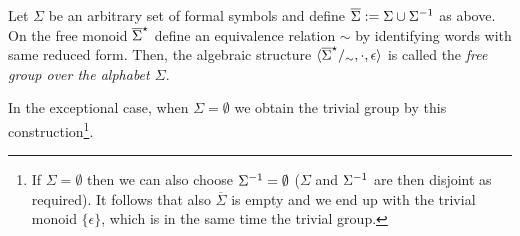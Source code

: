 \begin{definition}
\label{dfn_FreeGroup}
Let $\Sigma$ be an arbitrary set of formal symbols and define $\overline{\Sigma} := \Sigma \cup {\Sigma}^{-1}$ as above. On the free monoid ${\overline{\Sigma}}^{\star}$ define an equivalence relation $\sim$ by identifying words with same reduced form. Then, the algebraic structure $\langle {\overline{\Sigma}}^{\star}/_{\sim}, \cdot, \epsilon \rangle$ is called the \emph{free group over the alphabet $\Sigma$}.
\end{definition}
\begin{remark}
In the exceptional case, when $\Sigma = \emptyset$  we obtain the trivial group by this construction\footnote{If $\Sigma = \emptyset$ then we can also choose ${\Sigma}^{-1} = \emptyset$ ($\Sigma$ and ${\Sigma}^{-1}$ are then disjoint as required). It follows that also $\overline{\Sigma}$ is empty and we end up with the trivial monoid $\{\epsilon\}$, which is in the same time the trivial group.}.
\end{remark}
